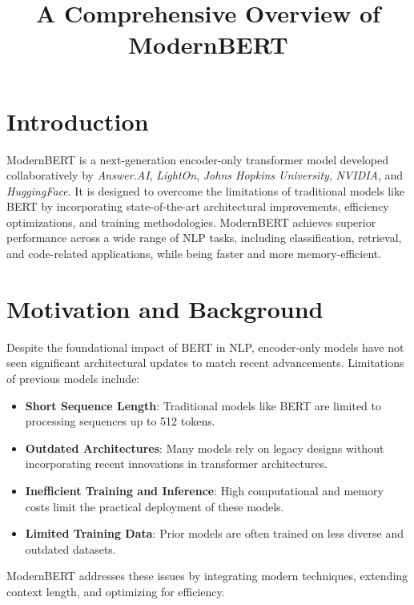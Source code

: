 \documentclass{article}
\begin{document}
  
  
\title{A Comprehensive Overview of ModernBERT}  
\author{}  
\date{}  
\maketitle  
  
\tableofcontents  
\newpage  
  
\section*{Introduction}  
  
ModernBERT is a next-generation encoder-only transformer model developed collaboratively by \emph{Answer.AI}, \emph{LightOn}, \emph{Johns Hopkins University}, \emph{NVIDIA}, and \emph{HuggingFace}. It is designed to overcome the limitations of traditional models like BERT by incorporating state-of-the-art architectural improvements, efficiency optimizations, and training methodologies. ModernBERT achieves superior performance across a wide range of NLP tasks, including classification, retrieval, and code-related applications, while being faster and more memory-efficient.  
  
\section{Motivation and Background}  
  
Despite the foundational impact of BERT in NLP, encoder-only models have not seen significant architectural updates to match recent advancements. Limitations of previous models include:  
  
\begin{itemize}  
    \item \textbf{Short Sequence Length}: Traditional models like BERT are limited to processing sequences up to 512 tokens.  
    \item \textbf{Outdated Architectures}: Many models rely on legacy designs without incorporating recent innovations in transformer architectures.  
    \item \textbf{Inefficient Training and Inference}: High computational and memory costs limit the practical deployment of these models.  
    \item \textbf{Limited Training Data}: Prior models are often trained on less diverse and outdated datasets.  
\end{itemize}  
  
ModernBERT addresses these issues by integrating modern techniques, extending context length, and optimizing for efficiency.  
  
\end{document}
